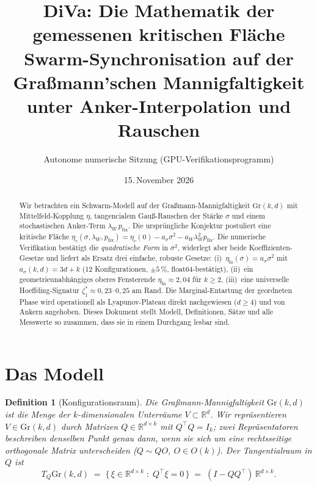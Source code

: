 \documentclass[11pt,a4paper]{article}
\title{DiVa: Die Mathematik der gemessenen kritischen Fläche\\
\large Swarm-Synchronisation auf der Graßmann'schen Mannigfaltigkeit\\
unter Anker-Interpolation und Rauschen}
\author{Autonome numerische Sitzung (GPU-Verifikationsprogramm)}
\date{15.\,November 2026}
\newtheorem{definition}[satz]{Definition}
\theoremstyle{remark}
\newcommand{\Gr}{\mathrm{Gr}}
\newcommand{\R}{\mathbb{R}}
\begin{document}
\maketitle

\begin{abstract}
Wir betrachten ein Schwarm-Modell auf der Graßmann-Mannigfaltigkeit
$\Gr(k,d)$ mit Mittelfeld-Kopplung $\eta$, tangencialem Gauß-Rauschen der
Stärke $\sigma$ und einem stochastischen Anker-Term
$\lambda_W\,p_{\mathrm{fix}}$. Die ursprüngliche Konjektur postuliert eine
kritische Fläche
$\eta_c(\sigma,\lambda_W,p_{\mathrm{fix}})=\eta_c(0)-a_\sigma\sigma^2-a_W\lambda_W^2p_{\mathrm{fix}}$.
Die numerische Verifikation bestätigt die \emph{quadratische Form} in
$\sigma^2$, widerlegt aber beide Koeffizienten-Gesetze und liefert als
Ersatz drei einfache, robuste Gesetze:
(i)~$\eta_{\mathrm{lo}}(\sigma)=a_\sigma\sigma^2$ mit
$a_\sigma(k,d)=3d+k$ (12 Konfigurationen, $\pm5\,\%$, float64-bestätigt),
(ii)~ein geometrieunabhängiges oberes Fensterende
$\eta_{\mathrm{hi}}\approx2{,}04$ für $k\ge2$,
(iii)~eine universelle Hoeffding-Signatur $\zeta_1^\ast\approx0{,}23$--$0{,}25$
am Rand. Die Marginal-Entartung der geordneten Phase wird operationell als
Lyapunov-Plateau direkt nachgewiesen ($d\ge4$) und von Ankern angehoben.
Dieses Dokument stellt Modell, Definitionen, Sätze und alle Messwerte
so zusammen, dass sie in einem Durchgang lesbar sind.
\end{abstract}

\tableofcontents

\section{Das Modell}

\begin{definition}[Konfigurationsraum]\label{def:gr}
Die Graßmann-Mannigfaltigkeit $\Gr(k,d)$ ist die Menge der
$k$-dimensionalen Unterräume $V\subset\R^d$. Wir repräsentieren
$V\in\Gr(k,d)$ durch Matrizen $Q\in\R^{d\times k}$ mit
$Q^\top Q=I_k$; zwei Repräsentatoren beschreiben denselben Punkt genau
dann, wenn sie sich um eine rechtsseitige orthogonale Matrix
unterscheiden ($Q\sim QO$, $O\in O(k)$). Der Tangentialraum in $Q$ ist
\[
T_Q\Gr(k,d)\;=\;\{\,\xi\in\R^{d\times k}\;:\;Q^\top\xi=0\,\}
\;=\;(I-QQ^\top)\,\R^{d\times k}.
\]
\end{definition}
\end{document}
